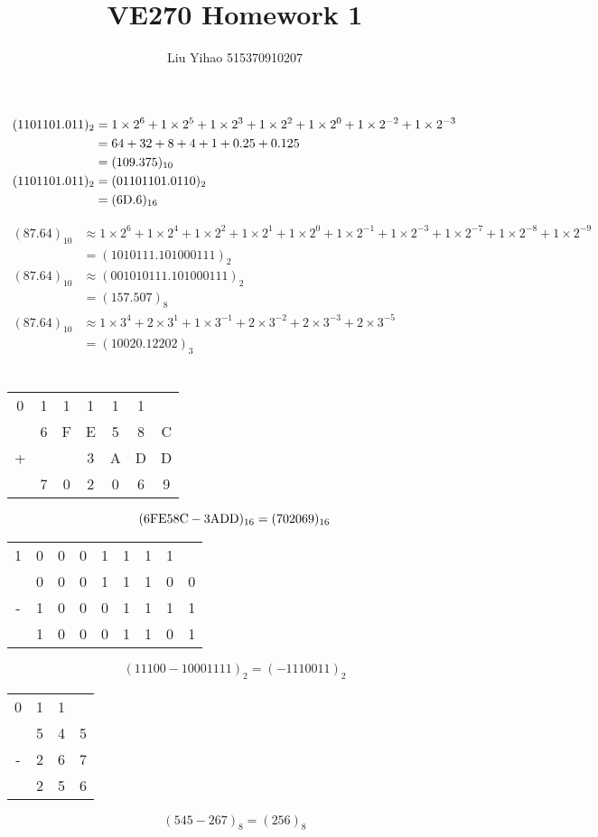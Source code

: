 \documentclass{article}
\title{VE270 Homework 1}
\author{Liu Yihao 515370910207}
\date{}
\begin{document}
\maketitle

\section{}
\begin{align*}
(1101101.011)_2
&=1\times2^6+1\times2^5+1\times2^3+1\times2^2
+1\times2^0+1\times2^{-2}+1\times2^{-3}\\
&=64+32+8+4+1+0.25+0.125\\
&=(109.375)_{10}\\
(1101101.011)_2
&=(01101101.0110)_2\\
&=\rm (6D.6)_{16}
\end{align*}

\begin{align*}
(87.64)_{10}
&\approx1\times2^6+1\times2^4+1\times2^2+1\times2^1+1\times2^0
+1\times2^{-1}+1\times2^{-3}+1\times2^{-7}+1\times2^{-8}+1\times2^{-9}\\
&=(1010111.101000111)_2\\
(87.64)_{10}
&\approx(001010111.101000111)_2\\
&=(157.507)_8\\
(87.64)_{10}
&\approx1\times3^4+2\times3^1+1\times3^{-1}+2\times3^{-2}+2\times3^{-3}
+2\times3^{-5}\\
&=(10020.12202)_3
\end{align*}

\section{}
\begin{center}
\begin{tabular}{ccccccc}
0&1&1&1&1&1\\
&6&F&E&5&8&C\\
+&&&3&A&D&D\\
\hline
&7&0&2&0&6&9
\end{tabular}
\end{center}
$$\rm(6FE58C-3ADD)_{16}=(702069)_{16}$$

\begin{center}
\begin{tabular}{ccccccccc}
1&0&0&0&1&1&1&1\\
&0&0&0&1&1&1&0&0\\
-&1&0&0&0&1&1&1&1\\
\hline
&1&0&0&0&1&1&0&1
\end{tabular}
\end{center}
$$(11100-10001111)_{2}=(-1110011)_{2}$$

\begin{center}
\begin{tabular}{cccc}
0&1&1\\
&5&4&5\\
-&2&6&7\\
\hline
&2&5&6
\end{tabular}
\end{center}
$$(545-267)_{8}=(256)_{8}$$
\end{document}

